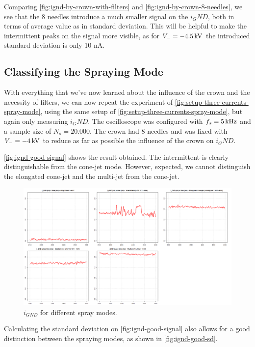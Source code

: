 \documentclass[oneside,12pt]{article}
\begin{document}
Comparing \autoref{fig:ignd-by-crown-with-filters} and \autoref{fig:ignd-by-crown-8-needles}, we see that the 8 needles introduce 
a much smaller signal on the $i_GND$, both in terms of average value as in standard deviation. This will be helpful to make  
the intermittent peaks on the signal more visible, as for $V_- = - 4.5 \,\mathrm{kV}$ the introduced standard deviation is only 10 nA.

\subsection{Classifying the Spraying Mode}

With everything that we've now learned about the influence of the crown and the necessity of filters, we can now repeat the experiment 
of \autoref{fig:setup-three-currents-spray-mode}, using the same setup of \autoref{fig:setup-three-currents-spray-mode}, but again only
measuring $i_GND$. The oscilloscope was configured with $f_s = 5 \,\mathrm{kHz}$ and a sample size of $N_s = 20.000$. The crown had 8 needles 
and was fixed with $V_- = - 4 \,\mathrm{kV}$ to reduce as far as possible the influence of the crown on $i_GND$.

\autoref{fig:ignd-good-signal} shows the result obtained. The intermittent is clearly distinguishable from the cone-jet mode. However, 
expected, we cannot distinguish the elongated cone-jet and the multi-jet from the cone-jet.

\begin{figure}[h!]
    \centering
    \includegraphics[width=1\textwidth,trim=1 1 1 1,clip]{figures/ignd-good-signal.png}
    \caption{$i_{GND}$ for different spray modes.}
    \label{fig:ignd-good-signal}
\end{figure}

Calculating the standard deviation on \autoref{fig:ignd-good-signal} also allows for a good distinction between the spraying modes,
as shown in \autoref{fig:ignd-good-sd}.
\end{document}
